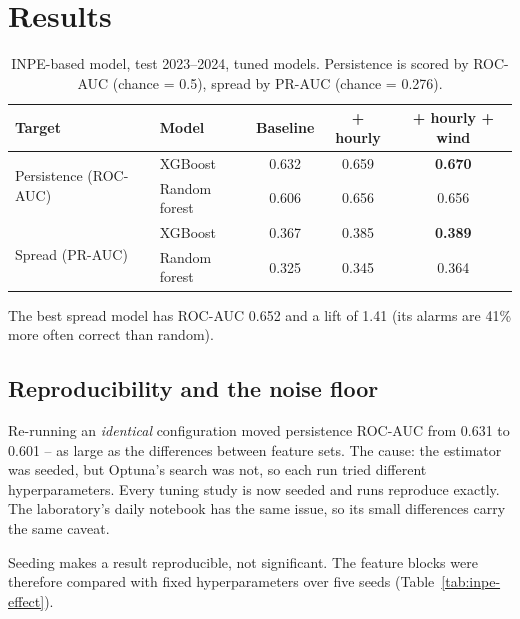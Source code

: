 \documentclass[11pt,a4paper,oneside]{report}
\begin{document}
\section{Results}

\begin{table}[H]
\centering\small
\caption[INPE-based model scores]{INPE-based model, test 2023--2024, tuned models.
Persistence is scored by ROC-AUC (chance = 0.5), spread by PR-AUC (chance =
0.276).}
\label{tab:inpe-results}
\begin{tabular}{llccc}
\toprule
Target & Model & Baseline & + hourly & + hourly + wind \\
\midrule
\multirow{2}{*}{Persistence (ROC-AUC)} & XGBoost & 0.632 & 0.659 & \textbf{0.670} \\
 & Random forest & 0.606 & 0.656 & 0.656 \\
\midrule
\multirow{2}{*}{Spread (PR-AUC)} & XGBoost & 0.367 & 0.385 & \textbf{0.389} \\
 & Random forest & 0.325 & 0.345 & 0.364 \\
\bottomrule
\end{tabular}
\end{table}

The best spread model has ROC-AUC 0.652 and a lift of 1.41 (its alarms are 41\%
more often correct than random).

\subsection{Reproducibility and the noise floor}

\begin{warnbox}
Re-running an \emph{identical} configuration moved persistence ROC-AUC from 0.631
to 0.601 -- as large as the differences between feature sets. The cause: the
estimator was seeded, but Optuna's search was not, so each run tried different
hyperparameters. Every tuning study is now seeded and runs reproduce exactly.
The laboratory's daily notebook has the same issue, so its small differences
carry the same caveat.
\end{warnbox}

Seeding makes a result reproducible, not significant. The feature blocks were
therefore compared with fixed hyperparameters over five seeds
(Table~\ref{tab:inpe-effect}).
\end{document}
